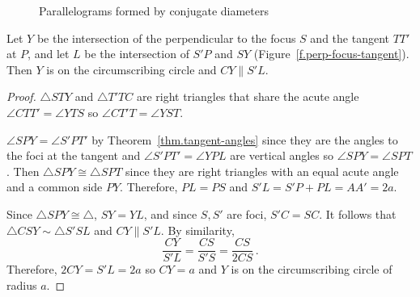 \begin{figure}[t]
\begin{center}
\caption{Parallelograms formed by conjugate diameters}\label{f.parallelogram-conjugate-diameters}
\end{center}
\end{figure}


\begin{theorem}\label{thm.perp-tangent}
Let $Y$ be the intersection of the perpendicular to the focus $S$ and the tangent $TT'$ at $P$, and let $L$ be the intersection of $S'P$ and $SY$ (Figure~\ref{f.perp-focus-tangent}). Then $Y$ is on the circumscribing circle and $CY\parallel S'L$.
\end{theorem}

\begin{proof}
$\triangle STY$ and $\triangle T'TC$ are right triangles that share the acute angle $\angle CTT'=\angle YTS$ so $\angle CT'T=\angle YST$.

$\angle SPY=\angle S'PT'$ by Theorem~\ref{thm.tangent-angles} since they are the angles to the foci at the tangent and $\angle S'PT'=\angle YPL$ are vertical angles so $\angle SPY=\angle SPT$. Then $\triangle SPY\cong\triangle SPT$ since they are right triangles with an equal acute angle and a common side $PY$. Therefore, $PL=PS$ and $S'L=S'P+PL=AA'=2a$.

Since $\triangle SPY\cong\triangle$, $SY=YL$, and since $S,S'$ are foci, $S'C=SC$. It follows that $\triangle CSY\sim \triangle S'SL$ and $CY\parallel S'L$. By similarity,
\[
\frac{CY}{S'L}=\frac{CS}{S'S}=\frac{CS}{2CS}\,.
\]
Therefore, $2CY=S'L=2a$ so $CY=a$ and $Y$ is on the circumscribing circle of radius $a$.\hqed
\end{proof}

